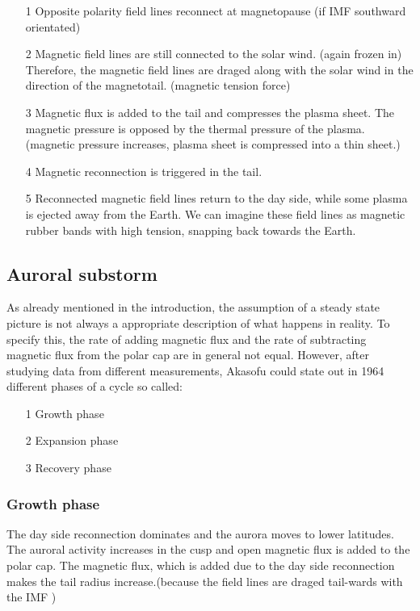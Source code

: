 \documentclass[10pt,a4paper]{article}
\begin{document}
\begin{itemize}
\item[1] Opposite polarity field lines reconnect at magnetopause (if IMF southward orientated)
\item[2] Magnetic field lines are still connected to the solar wind. (again frozen in) Therefore, the magnetic field lines are draged along with the solar wind in 
the direction of the magnetotail. (magnetic tension force)
\item[3] Magnetic flux is added to the tail and compresses the plasma sheet. The magnetic pressure is opposed by the thermal pressure of the plasma. 
(magnetic pressure increases, plasma sheet is compressed into a thin sheet.)
\item[4] Magnetic reconnection is triggered in the tail. 
\item[5] Reconnected magnetic field lines return to the day side, while some plasma is ejected away from the Earth. We can imagine these field lines as magnetic rubber bands 
with high tension, snapping back towards the Earth.
\end{itemize}

\subsection{Auroral substorm \label{_CHAP_THEO_substorm}}
As already mentioned in the introduction, the assumption of a steady state picture is not always a appropriate description of what happens in reality. To specify this,
the rate of adding magnetic flux and the rate of subtracting magnetic flux from the polar cap are in general not equal. However, after studying data from different 
measurements, Akasofu could state out in 1964 different phases of a cycle so called:
\begin{itemize}
\item[1] Growth phase
\item[2] Expansion phase
\item[3] Recovery phase
\end{itemize}
\subsubsection{Growth phase}
The day side reconnection dominates and the aurora moves to lower latitudes. The auroral activity increases in the cusp and open magnetic flux is added to the polar cap.
The magnetic flux, which is added due to the day side reconnection makes the tail radius increase.(because the field lines are draged tail-wards with the IMF )
\end{document}

